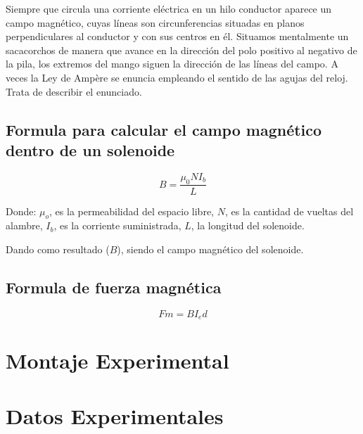 \documentclass[twocolumn, 12pt]{article}
\begin{document}
Siempre que circula una corriente eléctrica en un hilo
conductor aparece un campo magnético, cuyas líneas son
circunferencias situadas en planos perpendiculares al
conductor y con sus centros en él. Situamos mentalmente un
sacacorchos de manera que avance en la dirección del polo
positivo al negativo de la pila, los extremos del mango
siguen la dirección de las líneas del campo. A veces la Ley
de Ampère se enuncia empleando el sentido de las agujas del
reloj. Trata de describir el enunciado.

\subsection*{Formula para calcular el campo magnético dentro de un solenoide}

\begin{equation}
	B = {\frac{\mu_0 N I_b}{L}} \label{eq:FormulaCampoMagneticoSolenoide}
\end{equation}

\nocite{Garcia2016}

Donde: \hfill \break{} \textit{{\large $\mu_o$}}, es la
permeabilidad del espacio libre, \textit{{\large $N$}}, es
la cantidad de vueltas del alambre, \textit{{\large
			$I_b$}}, es la corriente suministrada, \textit{{\large
			$L$}}, la longitud del solenoide.

Dando como resultado (\textit{{\large $B$}}), siendo el
campo magnético del solenoide.

\subsection*{Formula de fuerza magnética}

\begin{equation}
	Fm = B I_e d \label{eq:FormulaFuerzaMagnetica}
\end{equation}

\section{Montaje Experimental}

\section{Datos Experimentales}
\end{document}
